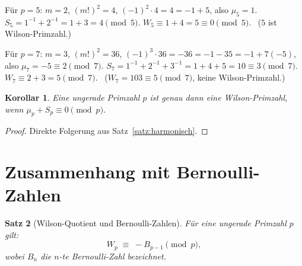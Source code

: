 \documentclass[12pt,a4paper]{amsart}
\newtheorem{theorem}{Satz}[section]
\newtheorem{korollar}[theorem]{Korollar}
\theoremstyle{definition}
\begin{document}
\begin{beispiel}
  Für $p = 5$: $m = 2$, $(m!)^2 = 4$, $(-1)^2 \cdot 4 = 4 = -1 + 5$,
  also $\mu_5 = 1$.  $S_5 = 1^{-1} + 2^{-1} = 1 + 3 = 4 \pmod 5$.
  $W_5 \equiv 1 + 4 = 5 \equiv 0 \pmod 5$. \checkmark\ ($5$ ist Wilson-Primzahl.)

  Für $p = 7$: $m = 3$, $(m!)^2 = 36$, $(-1)^3 \cdot 36 = -36 = -1 - 35 = -1 + 7(-5)$,
  also $\mu_7 = -5 \equiv 2 \pmod 7$.
  $S_7 = 1^{-1}+2^{-1}+3^{-1} = 1+4+5 = 10 \equiv 3 \pmod 7$.
  $W_7 \equiv 2+3 = 5 \pmod 7$. \checkmark\ ($W_7 = 103 \equiv 5 \pmod 7$, keine Wilson-Primzahl.)
\end{beispiel}

\begin{korollar}\label{kor:wilson_primzahl_kriterium_2}
  Eine ungerade Primzahl $p$ ist genau dann eine Wilson-Primzahl, wenn
  $\mu_p + S_p \equiv 0 \pmod{p}$.
\end{korollar}

\begin{proof}
  Direkte Folgerung aus Satz~\ref{satz:harmonisch}.
\end{proof}

\section{Zusammenhang mit Bernoulli-Zahlen}

\begin{theorem}[Wilson-Quotient und Bernoulli-Zahlen]\label{satz:bernoulli}
  Für eine ungerade Primzahl $p$ gilt:
  \[
    W_p \;\equiv\; -B_{p-1} \pmod{p},
  \]
  wobei $B_n$ die $n$-te Bernoulli-Zahl bezeichnet.
\end{theorem}
\end{document}
